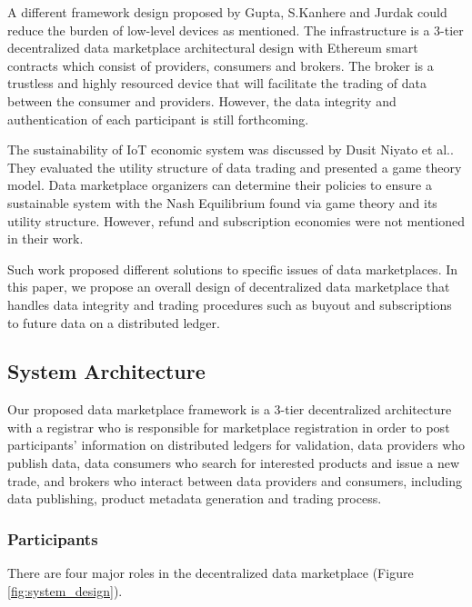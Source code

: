 \documentclass[journal,article,applsci,submit,moreauthors,pdftex]{Definitions/mdpi}
\begin{document}
A different framework design proposed by Gupta, S.Kanhere and Jurdak\cite{3tierDataMarket} could reduce the burden of low-level devices as mentioned. The infrastructure is a 3-tier decentralized data marketplace architectural design with Ethereum smart contracts which consist of providers, consumers and brokers. The broker is a trustless and highly resourced device that will facilitate the trading of data between the consumer and providers. However, the data integrity and authentication of each participant is still forthcoming.

The sustainability of IoT economic system was discussed by Dusit Niyato et al.\cite{UtilityStruct}. They evaluated the utility structure of data trading and presented a game theory model.  Data marketplace organizers can determine their policies to ensure a sustainable system with the Nash Equilibrium found via game theory and its utility structure. However, refund and subscription economies were not mentioned in their work.

Such work proposed different solutions to specific issues of data marketplaces. In this paper, we propose an overall design of decentralized data marketplace that handles data integrity and trading procedures such as buyout and subscriptions to future data on a distributed ledger.

\subsection{System Architecture}
Our proposed data marketplace framework is a 3-tier decentralized architecture with a registrar who is responsible for marketplace registration in order to post participants' information on distributed ledgers for validation, data providers who publish data, data consumers who search for interested products and issue a new trade, and brokers who interact between data providers and consumers, including data publishing, product metadata generation and trading process.

\subsubsection{Participants}
There are four major roles in the decentralized data marketplace (Figure \ref{fig:system_design}).
\end{document}
